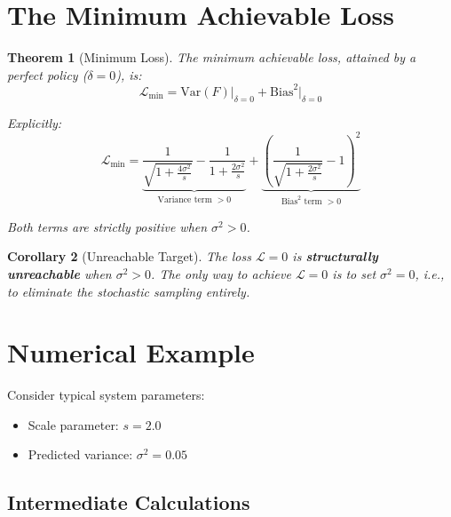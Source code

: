 \documentclass[11pt,a4paper]{article}
\newtheorem{theorem}{Theorem}
\newtheorem{corollary}[theorem]{Corollary}
\theoremstyle{definition}
\newcommand{\Var}{\mathrm{Var}}
\begin{document}
\section{The Minimum Achievable Loss}

\begin{theorem}[Minimum Loss]
\label{thm:min-loss}
The minimum achievable loss, attained by a perfect policy ($\delta = 0$), is:
\begin{equation}
    \mathcal{L}_{\min} = \Var(F)\big|_{\delta=0} + \mathrm{Bias}^2\big|_{\delta=0}
\end{equation}

Explicitly:
\begin{equation}
    \mathcal{L}_{\min} = \underbrace{\frac{1}{\sqrt{1 + \frac{4\sigma^2}{s}}} - \frac{1}{1 + \frac{2\sigma^2}{s}}}_{\text{Variance term } > 0} + \underbrace{\left(\frac{1}{\sqrt{1 + \frac{2\sigma^2}{s}}} - 1\right)^2}_{\text{Bias}^2 \text{ term } > 0}
\end{equation}

Both terms are strictly positive when $\sigma^2 > 0$.
\end{theorem}

\begin{corollary}[Unreachable Target]
The loss $\mathcal{L} = 0$ is \textbf{structurally unreachable} when $\sigma^2 > 0$. The only way to achieve $\mathcal{L} = 0$ is to set $\sigma^2 = 0$, i.e., to eliminate the stochastic sampling entirely.
\end{corollary}

\section{Numerical Example}

Consider typical system parameters:
\begin{itemize}
    \item Scale parameter: $s = 2.0$
    \item Predicted variance: $\sigma^2 = 0.05$
\end{itemize}

\subsection{Intermediate Calculations}
\end{document}
